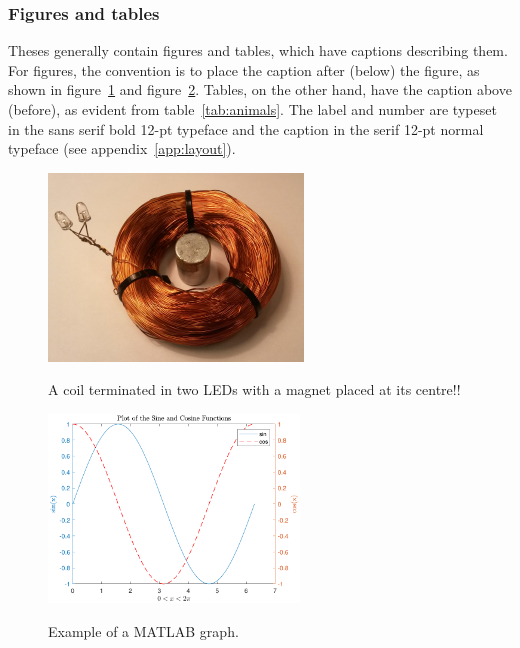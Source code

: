 \documentclass[english, 12pt, a4paper, elec, utf8, a-2b, online]{aaltothesis}
\begin{document}
\subsubsection{Figures and tables}

Theses generally contain figures and tables, which have captions describing 
them. For figures, the convention is to place the caption after (below) the 
figure, as shown in figure~\ref{fig:coil} and figure~\ref{fig:graph}. Tables, on
the other hand, have the caption above (before), as evident from 
table~\ref{tab:animals}. The label and number are typeset in the sans serif bold
12-pt typeface and the caption in the serif 12-pt normal typeface (see 
appendix~\ref{app:layout}).

\begin{figure}[tb]
  \centering
  \includegraphics[alt={A coil of copper wire with a magnet placed in the centre of the coil and two LEDs connected at the ends of the coiled wire.}, height=5cm]{./ledspole.jpg}
  \caption{A coil terminated in two LEDs with a magnet placed at its centre!!}
  \label{fig:coil}
\end{figure}

\begin{figure}[tb]
  \centering
  \includegraphics[alt={One period of a since and a cosine curve from 0 to 2 pi radians and having amplitude 1.}, height=5cm]{curves.pdf}
  \caption{Example of a MATLAB graph.}
  \label{fig:graph}
\end{figure}
\end{document}
